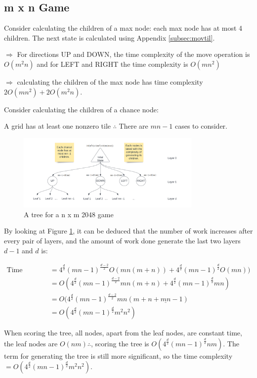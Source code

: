 \documentclass{article}
\begin{document}
\subsection{m x n Game}
Consider calculating the children of a max node: each max node has at most 4 children. The next state is calculated using Appendix \ref{subsec:movtil}.


$\Rightarrow$ For directions UP and DOWN, the time complexity of the move operation is $O(m^2n)$ and for LEFT and RIGHT the time complexity is $O(mn^2)$

$\Rightarrow$ calculating the children of the max node has time complexity $2O(mn^2) + 2O(m^2n)$.

Consider calculating the children of a chance node:

A grid has at least one nonzero tile $\therefore$ There are $mn - 1$ cases to consider.

\begin{figure}
    \centering
    \includegraphics[width=0.8\textwidth]{expectimax tree.png}
    \caption{A tree for a n x m 2048 game}
    \label{fig:nm2048}
\end{figure}

By looking at Figure \ref{fig:nm2048}, it can be deduced that the number of work increases after every pair of layers, and the amount of work done generate the last two layers $d - 1$ and $d$ is: 

\begin{align}
\text{Time Complexity} & = 4^\frac{d}{2}(mn - 1)^{\frac{d - 2}{2}}O(mn(m+n)) + 4^\frac{d}{2}(mn - 1)^{\frac{d}{2}}O(mn)) \\
 & = O(4^\frac{d}{2}(mn - 1)^\frac{d - 2}{2}mn(m+n) + 4^\frac{d}{2}(mn - 1)^\frac{d}{2}mn) \\
 & = O(4^\frac{d}{2}(mn - 1)^\frac{d - 2}{2}mn(m + n + \underline{mn} - 1) \\
 & = O(4^\frac{d}{2}(mn - 1)^\frac{d}{2}m^2n^2)
\end{align}

When scoring the tree, all nodes, apart from the leaf nodes, are constant time, the leaf nodes are $O(nm) \therefore$, scoring the tree is $O(4^\frac{d}{2}(mn - 1)^\frac{d}{2}nm)$.
The term for generating the tree is still more significant, so the time complexity $= O(4^\frac{d}{2}(mn - 1)^\frac{d}{2}m^2n^2)$.
\end{document}
